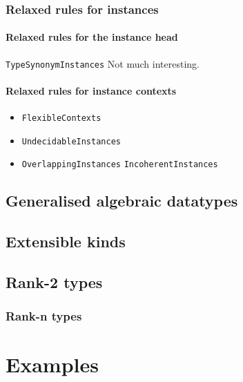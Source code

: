 \documentclass[11pt,oneside,draft]{fithesis2}
\theoremstyle{definition}
\begin{document}
\subsection{Relaxed rules for instances}

\subsubsection{Relaxed rules for the instance head}

\texttt{TypeSynonymInstances} Not much interesting.

\subsubsection{Relaxed rules for instance contexts}

\begin{itemize}
\item \texttt{FlexibleContexts}
\item \texttt{UndecidableInstances}
\item \texttt{OverlappingInstances} \texttt{IncoherentInstances}
\end{itemize}

\section{Generalised algebraic datatypes}

\section{Extensible kinds}

\section{Rank-2 types}

\subsection{Rank-n types}


\chapter{Examples}
\end{document}
